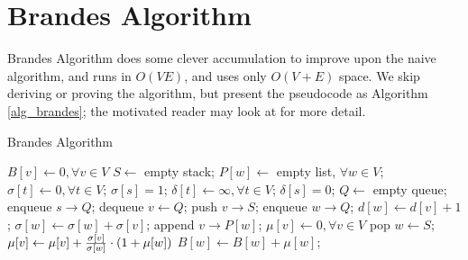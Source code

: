 \chapter{Brandes Algorithm}
\label{brandes}
Brandes Algorithm does some clever accumulation to improve upon the naive
algorithm, and runs in $O(VE)$, and uses only $O(V + E)$ space.
We skip deriving or proving the algorithm, but present the pseudocode as
Algorithm \ref{alg_brandes};
the motivated reader may look at \cite{brandes01} for more detail.

\begin{algorithm}[H]
\caption{Brandes Algorithm}
\label{alg_brandes}
\begin{algorithmic}
	\State $B[v] \gets 0, \forall v \in V$
		\State $S \gets$ empty stack;
		\State $P[w] \gets$ empty list, $\forall w \in V$;
		\State $\sigma[t] \gets 0, \forall t \in V$; $\sigma[s] = 1$;
		\State $\delta[t] \gets \infty, \forall t \in V$; $\delta[s] = 0$;
		\State $Q \gets$ empty queue;
		\State enqueue $s \rightarrow Q$;
			\State dequeue $v \gets Q$;
			\State push $v \rightarrow S$;
					\State enqueue $w \rightarrow Q$;
					\State $d[w] \gets d[v] + 1$;
				\EndIf
					\State $\sigma[w] \gets \sigma[w] + \sigma[v]$;
					\State append $v \rightarrow P[w]$;
				\EndIf
			\EndFor
		\EndWhile
		\State $\mu[v] \gets 0, \forall v \in V$
			\State pop $w \gets S$;
				\State $\mu[v] \gets \mu[v] + \frac{\sigma[v]}{\sigma[w]}
					\cdot \paren*{1 + \mu[w]}$
			\EndFor
				\State $B[w] \gets B[w] + \mu[w]$;
			\EndIf
		\EndWhile
	\EndFor
\EndFunction
\end{algorithmic}
\end{algorithm}
